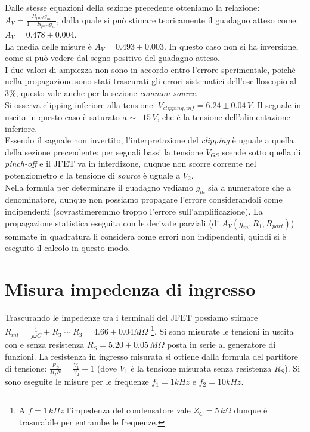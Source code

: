 \documentclass[10pt,a4paper]{article}
\begin{document}
Dalle stesse equazioni della sezione precedente otteniamo la relazione: $A_V = \frac{R_{part} g_m}{1+R_{part} g_m}$, dalla quale si può stimare teoricamente il guadagno atteso come: $A_V = 0.478\pm0.004$. \\
La media delle misure è $A_V = 0.493\pm0.003$. In questo caso non si ha inversione, come si può vedere dal segno positivo del guadagno atteso.\\
I due valori di ampiezza non sono in accordo entro l'errore sperimentale, poichè nella propagazione sono stati trascurati gli errori sistematici dell'oscilloscopio al $3\%$, questo vale anche per la sezione \emph{common source}.\\
Si osserva clipping inferiore alla tensione: $V_{clipping, inf} = 6.24\pm0.04\,V $. Il segnale in uscita in questo caso è saturato a $\sim -15\,V$, che è la tensione dell'alimentazione inferiore.\\
Essendo il sagnale non invertito, l'interpretazione del \emph{clipping} è uguale a quella della sezione precendente: per segnali bassi la tensione $V_{GS}$ scende sotto quella di \emph{pinch-off} e il JFET va in interdizone, duqnue non scorre corrente nel potenziometro e la tensione di \emph{source} è uguale a $V_2$.\\
Nella formula per determinare il guadagno vediamo $g_m$ sia a numeratore che a denominatore, dunque non possiamo propagare l'errore considerandoli come indipendenti (sovrastimeremmo troppo l'errore sull'amplificazione). La propagazione statistica eseguita con le derivate parziali (di $A_V(g_m, R_1, R_{part})$) sommate in quadratura li considera come errori non indipendenti, quindi si è eseguito il calcolo in questo modo.\\

\section{Misura impedenza di ingresso}
Trascurando le impedenze tra i terminali del JFET possiamo stimare $R_{int} = \frac{1}{j \omega C} + R_3 \sim R_3 = 4.66\pm0.04 M\Omega$ \footnote{A $f = 1\,kHz$ l'impedenza del condensatore vale $Z_C = 5\,k\Omega$ dunque è trasurabile per entrambe le frequenze.}. Si sono misurate le tensioni in uscita con e senza resistenza $R_{S} = 5.20 \pm 0.05 \, M\Omega$ posta in serie al generatore di funzioni. La resistenza in ingresso misurata si ottiene dalla formula del partitore di tensione: $\frac{R_S}{R_IN} = \frac {V_1}{V_2} - 1$ (dove $V_1$ è la tensione misurata senza resistenza $R_S$). Si sono eseguite le misure per le frequenze $f_1 = 1 kHz$ e $f_2 = 10 kHz$.
\end{document}

